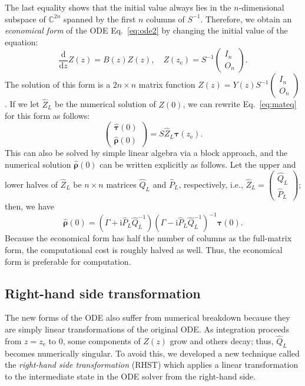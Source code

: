 \documentclass[preprint, 5p, times, sort&compress]{elsarticle}
\def\vtau{\bm{\tau}}
\def\vrho{\bm{\rho}}
\def\zbot{z_\text{e}}
\def\dd{\mathrm{d}}
\def\imag{\mathrm{i}}
\begin{document}
        The last equality shows that the initial value always lies in the $n$-dimensional subspace of
        $\mathbb{C}^{2n}$ spanned by the first $n$ columns of $S^{-1}$.
        Therefore, we obtain an \emph{economical form} of the ODE Eq.~\eqref{eq:ode2} by changing the initial value of the equation:
        \begin{equation}
                \frac{\dd}{\dd z}Z(z) = B(z)Z(z),\quad Z(\zbot) = S^{-1}\begin{pmatrix}I_n \\ O_n \end{pmatrix}.
        \end{equation}
        The solution of this form is a $2n\times n$ matrix function $Z(z) = Y(z)S^{-1}\begin{pmatrix}I_n \\ O_n\end{pmatrix}$.
        If we let $\hat{Z}_L$ be the numerical solution of $Z(0)$,
        we can rewrite Eq.~\eqref{eq:mateq} for this form as follows:
        \begin{equation}
                \begin{pmatrix}
                        \hat{\vtau}(0) \\
                        \hat{\vrho}(0)
                \end{pmatrix}
                = S\hat{Z}_L\vtau(\zbot).
                \label{eq:mateq2}
        \end{equation}
        This can also be solved by simple linear algebra via a block approach,
        and the numerical solution $\hat{\vrho}(0)$ can be written explicitly as follows.
        Let the upper and lower halves of $\hat{Z}_L$ be $n\times n$ matrices $\hat{Q}_L$ and $\hat{P}_L$, respectively,
        i.e., $\hat{Z}_L = \begin{pmatrix} \hat{Q}_L \\ \hat{P}_L\end{pmatrix}$; then, 
        we have
        \begin{equation}
                \hat{\vrho}(0) = \left(\Gamma+\imag \hat{P}_L\hat{Q}_L^{-1}\right)\left(\Gamma-\imag \hat{P}_L\hat{Q}_L^{-1}\right)^{-1} \vtau(0). \label{eq:vrhocomp}
        \end{equation}
        Because the economical form has half the number of columns as the full-matrix form, the computational cost is roughly halved as well.
        Thus, the economical form is preferable for computation.

        \subsection{Right-hand side transformation}
        The new forms of the ODE also suffer from numerical breakdown
        because they are simply linear transformations of the original ODE.
        As integration proceeds from $z=\zbot$ to $0$, some components of $Z(z)$ grow and others decay; thus,
        $\hat{Q}_L$ becomes numerically singular.
        To avoid this, we developed a new technique called the \emph{right-hand side transformation} (RHST)
        which applies a linear transformation
        to the intermediate state in the ODE solver from the right-hand side.
\end{document}
